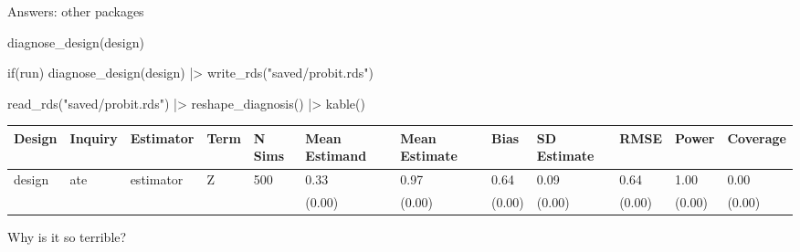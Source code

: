 \documentclass[
  11pt,
  ignorenonframetext,
]{beamer}
\newenvironment{Shaded}{\begin{snugshade}}{\end{snugshade}}
\newcommand{\ControlFlowTok}[1]{\textcolor[rgb]{0.00,0.23,0.31}{#1}}
\newcommand{\FunctionTok}[1]{\textcolor[rgb]{0.28,0.35,0.67}{#1}}
\newcommand{\NormalTok}[1]{\textcolor[rgb]{0.00,0.23,0.31}{#1}}
\newcommand{\SpecialCharTok}[1]{\textcolor[rgb]{0.37,0.37,0.37}{#1}}
\newcommand{\StringTok}[1]{\textcolor[rgb]{0.13,0.47,0.30}{#1}}
\begin{document}
\begin{frame}[fragile]{Answers: other packages}
\protect\hypertarget{answers-other-packages-1}{}
\begin{Shaded}
\begin{Highlighting}[]
\FunctionTok{diagnose\_design}\NormalTok{(design)}
\end{Highlighting}
\end{Shaded}

\begin{Shaded}
\begin{Highlighting}[]
\ControlFlowTok{if}\NormalTok{(run)}
  \FunctionTok{diagnose\_design}\NormalTok{(design) }\SpecialCharTok{|\textgreater{}} \FunctionTok{write\_rds}\NormalTok{(}\StringTok{"saved/probit.rds"}\NormalTok{)}

\FunctionTok{read\_rds}\NormalTok{(}\StringTok{"saved/probit.rds"}\NormalTok{) }\SpecialCharTok{|\textgreater{}} \FunctionTok{reshape\_diagnosis}\NormalTok{() }\SpecialCharTok{|\textgreater{}} \FunctionTok{kable}\NormalTok{()}
\end{Highlighting}
\end{Shaded}

\begin{tabular}{l|l|l|l|l|l|l|l|l|l|l|l}
\hline
Design & Inquiry & Estimator & Term & N Sims & Mean Estimand & Mean Estimate & Bias & SD Estimate & RMSE & Power & Coverage\\
\hline
design & ate & estimator & Z & 500 & 0.33 & 0.97 & 0.64 & 0.09 & 0.64 & 1.00 & 0.00\\
\hline
 &  &  &  &  & (0.00) & (0.00) & (0.00) & (0.00) & (0.00) & (0.00) & (0.00)\\
\hline
\end{tabular}

Why is it so terrible?
\end{frame}
\end{document}
